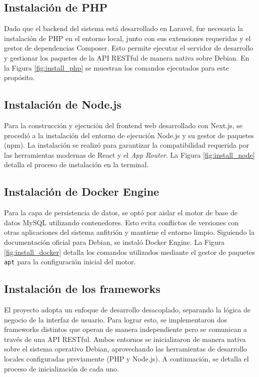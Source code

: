 \documentclass[12pt,letterpaper]{report}
\begin{document}
	\subsection{Instalación de PHP} 
	Dado que el backend del sistema está desarrollado en Laravel, fue necesaria la instalación de PHP en el entorno local, junto con sus extensiones requeridas y el gestor de dependencias Composer. Esto permite ejecutar el servidor de desarrollo y gestionar los paquetes de la API RESTful de manera nativa sobre Debian. En la Figura \ref{fig:install_php} se muestran los comandos ejecutados para este propósito.
	
	
	\subsection{Instalación de Node.js} 
	Para la construcción y ejecución del frontend web desarrollado con Next.js, se procedió a la instalación del entorno de ejecución Node.js y su gestor de paquetes (npm). La instalación se realizó para garantizar la compatibilidad requerida por las herramientas modernas de React y el \textit{App Router}. La Figura \ref{fig:install_node} detalla el proceso de instalación en la terminal.
	
	
	\subsection{Instalación de Docker Engine} 
	Para la capa de persistencia de datos, se optó por aislar el motor de base de datos MySQL utilizando contenedores. Esto evita conflictos de versiones con otras aplicaciones del sistema anfitrión y mantiene el entorno limpio. Siguiendo la documentación oficial para Debian, se instaló Docker Engine. La Figura \ref{fig:install_docker} detalla los comandos utilizados mediante el gestor de paquetes \texttt{apt} para la configuración inicial del motor.
	
	
	
	\subsection{Instalación de los frameworks} 
	El proyecto adopta un enfoque de desarrollo desacoplado, separando la lógica de negocio de la interfaz de usuario. Para lograr esto, se implementaron dos frameworks distintos que operan de manera independiente pero se comunican a través de una API RESTful. Ambos entornos se inicializaron de manera nativa sobre el sistema operativo Debian, aprovechando las herramientas de desarrollo locales configuradas previamente (PHP y Node.js). A continuación, se detalla el proceso de inicialización de cada uno.
	
\end{document}
